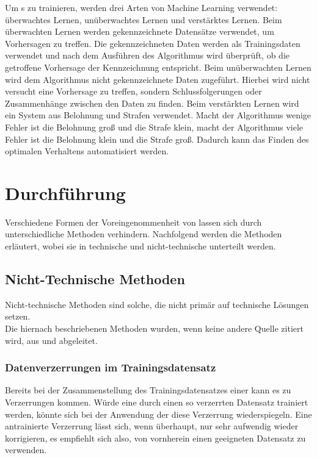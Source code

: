 \documentclass[12pt]{report}
\begin{document}
Um  s zu trainieren, werden drei Arten von Machine Learning verwendet: überwachtes Lernen, unüberwachtes Lernen und verstärktes Lernen. 
Beim überwachten Lernen werden gekennzeichnete Datensätze verwendet, um Vorhersagen zu treffen. Die gekennzeichneten Daten werden als Trainingsdaten verwendet und nach dem Ausführen des Algorithmus wird überprüft, ob die getroffene Vorhersage der Kennzeichnung entspricht.
Beim unüberwachten Lernen wird dem Algorithmus nicht gekennzeichnete Daten zugeführt. Hierbei wird nicht versucht eine Vorhersage zu treffen, sondern Schlussfolgerungen oder Zusammenhänge zwischen den Daten zu finden.
Beim verstärkten Lernen wird ein System aus Belohnung und Strafen verwendet. Macht der Algorithmus wenige Fehler ist die Belohnung groß und die Strafe klein, macht der Algorithmus viele Fehler ist die Belohnung klein und die Strafe groß. Dadurch kann das Finden des 
optimalen Verhaltens automatisiert werden.
\cite{serafeim}




\chapter{Durchführung}\label{execution}
Verschiedene Formen der Voreingenommenheit von  lassen sich durch unterschiedliche Methoden verhindern. Nachfolgend werden die Methoden erläutert, wobei sie in technische und nicht-technische unterteilt werden.

\section{Nicht-Technische Methoden}
Nicht-technische Methoden sind solche, die nicht primär auf technische Lösungen setzen.\\
Die hiernach beschriebenen Methoden wurden, wenn keine andere Quelle zitiert wird, aus \cite{UNESCO} und \cite{EUCommision} abgeleitet. %

\subsection{Datenverzerrungen im Trainingsdatensatz}
Bereits bei der Zusammenstellung des Trainingsdatensatzes einer  kann es zu Verzerrungen kommen. Würde eine  durch einen so verzerrten Datensatz trainiert werden, könnte sich bei der Anwendung der  diese Verzerrung wiederspiegeln. Eine antrainierte Verzerrung lässt sich, wenn überhaupt, nur sehr aufwendig wieder korrigieren, es empfiehlt sich also, von vornherein einen geeigneten Datensatz zu verwenden.
\end{document}
